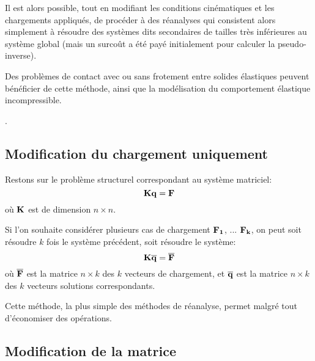 Il est alors possible, tout en modifiant les conditions cinématiques et les chargements appliqués,
de procéder à des réanalyses qui consistent alors simplement à résoudre des systèmes
dits secondaires de tailles très inférieures au système global (mais un surcoût a été
\og payé\fg{} initialement pour calculer la pseudo-inverse).

Des problèmes de contact avec ou sans frotement entre solides élastiques peuvent
bénéficier de cette méthode, ainsi que la modélisation du comportement élastique
incompressible.

\medskip
{}.


\medskip
\subsection{Modification du chargement uniquement}

Restons sur le problème structurel correspondant au système matriciel:
\begin{equation}
\mathbf{K} \mathbf{q} = \mathbf{F}
\end{equation}
où $\mathbf{K}$ est de dimension $n\times n$.%

\medskip
Si l'on souhaite considérer plusieurs cas de chargement $\mathbf{F_1}$, ... $\mathbf{F_k}$, on peut soit résoudre
$k$ fois le système précédent, soit résoudre le système:
\begin{equation}
\mathbf{K} \mathbf{\overline{q}} =\mathbf{\overline{F}}
\end{equation}
où $\mathbf{\overline{F}}$ est la matrice $n\times k$ des $k$ vecteurs de chargement, et $\mathbf{\overline{q}}$ est la 
matrice $n\times k$ des $k$ vecteurs solutions correspondants.

\medskip
Cette méthode, la plus simple des méthodes de réanalyse, permet malgré tout
d'économiser des opérations.


\medskip
\subsection{Modification de la matrice}

